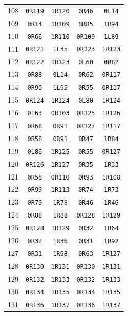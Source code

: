 \begin{longtable}{rcccc}
108 & \texttt{0R119} & \texttt{1R120} & \texttt{0R46} & \texttt{0L14} \\
109 & \texttt{0R14} & \texttt{1R109} & \texttt{0R85} & \texttt{1R94} \\
110 & \texttt{0R66} & \texttt{1R110} & \texttt{0R109} & \texttt{1L89} \\
111 & \texttt{0R121} & \texttt{1L35} & \texttt{0R123} & \texttt{1R123} \\
112 & \texttt{0R122} & \texttt{1R123} & \texttt{0L60} & \texttt{0R82} \\
113 & \texttt{0R88} & \texttt{0L14} & \texttt{0R62} & \texttt{0R117} \\
114 & \texttt{0R90} & \texttt{1L95} & \texttt{0R55} & \texttt{0R117} \\
115 & \texttt{0R124} & \texttt{1R124} & \texttt{0L80} & \texttt{1R124} \\
116 & \texttt{0L63} & \texttt{0R103} & \texttt{0R125} & \texttt{1R126} \\
117 & \texttt{0R68} & \texttt{0R91} & \texttt{0R127} & \texttt{1R117} \\
118 & \texttt{0R58} & \texttt{0R91} & \texttt{0R47} & \texttt{1R84} \\
119 & \texttt{0L86} & \texttt{1R125} & \texttt{0R55} & \texttt{0R127} \\
120 & \texttt{0R126} & \texttt{1R127} & \texttt{0R35} & \texttt{1R33} \\
121 & \texttt{0R58} & \texttt{0R110} & \texttt{0R93} & \texttt{1R108} \\
122 & \texttt{0R99} & \texttt{1R113} & \texttt{0R74} & \texttt{1R73} \\
123 & \texttt{0R79} & \texttt{1R78} & \texttt{0R46} & \texttt{1R46} \\
124 & \texttt{0R88} & \texttt{1R88} & \texttt{0R128} & \texttt{1R129} \\
125 & \texttt{0R128} & \texttt{1R129} & \texttt{0R32} & \texttt{1R64} \\
126 & \texttt{0R32} & \texttt{1R36} & \texttt{0R31} & \texttt{1R92} \\
127 & \texttt{0R31} & \texttt{1R98} & \texttt{0R63} & \texttt{1R127} \\
128 & \texttt{0R130} & \texttt{1R131} & \texttt{0R130} & \texttt{1R131} \\
129 & \texttt{0R132} & \texttt{1R133} & \texttt{0R132} & \texttt{1R133} \\
130 & \texttt{0R134} & \texttt{1R135} & \texttt{0R134} & \texttt{1R135} \\
131 & \texttt{0R136} & \texttt{1R137} & \texttt{0R136} & \texttt{1R137} \\

\end{longtable}
